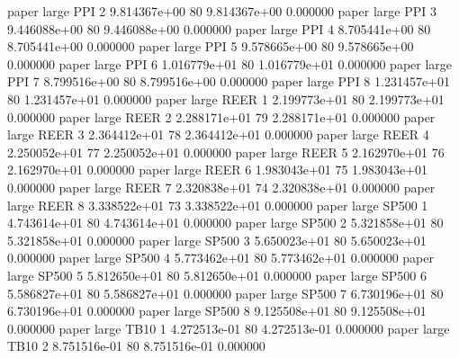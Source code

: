               paper      large      PPI                 2 9.814367e+00 80   9.814367e+00           0.000000
              paper      large      PPI                 3 9.446088e+00 80   9.446088e+00           0.000000
              paper      large      PPI                 4 8.705441e+00 80   8.705441e+00           0.000000
              paper      large      PPI                 5 9.578665e+00 80   9.578665e+00           0.000000
              paper      large      PPI                 6 1.016779e+01 80   1.016779e+01           0.000000
              paper      large      PPI                 7 8.799516e+00 80   8.799516e+00           0.000000
              paper      large      PPI                 8 1.231457e+01 80   1.231457e+01           0.000000
              paper      large     REER                 1 2.199773e+01 80   2.199773e+01           0.000000
              paper      large     REER                 2 2.288171e+01 79   2.288171e+01           0.000000
              paper      large     REER                 3 2.364412e+01 78   2.364412e+01           0.000000
              paper      large     REER                 4 2.250052e+01 77   2.250052e+01           0.000000
              paper      large     REER                 5 2.162970e+01 76   2.162970e+01           0.000000
              paper      large     REER                 6 1.983043e+01 75   1.983043e+01           0.000000
              paper      large     REER                 7 2.320838e+01 74   2.320838e+01           0.000000
              paper      large     REER                 8 3.338522e+01 73   3.338522e+01           0.000000
              paper      large    SP500                 1 4.743614e+01 80   4.743614e+01           0.000000
              paper      large    SP500                 2 5.321858e+01 80   5.321858e+01           0.000000
              paper      large    SP500                 3 5.650023e+01 80   5.650023e+01           0.000000
              paper      large    SP500                 4 5.773462e+01 80   5.773462e+01           0.000000
              paper      large    SP500                 5 5.812650e+01 80   5.812650e+01           0.000000
              paper      large    SP500                 6 5.586827e+01 80   5.586827e+01           0.000000
              paper      large    SP500                 7 6.730196e+01 80   6.730196e+01           0.000000
              paper      large    SP500                 8 9.125508e+01 80   9.125508e+01           0.000000
              paper      large     TB10                 1 4.272513e-01 80   4.272513e-01           0.000000
              paper      large     TB10                 2 8.751516e-01 80   8.751516e-01           0.000000

